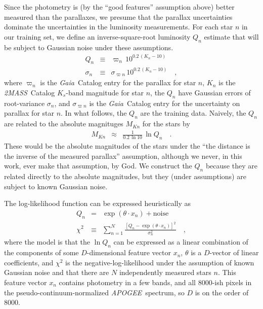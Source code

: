 \documentclass[modern]{aastex62}
\newcommand{\acronym}[1]{{\small{#1}}}
\newcommand{\project}[1]{\textsl{#1}}
\newcommand{\apogee}{\project{\acronym{APOGEE}}}
\newcommand{\gaia}{\project{Gaia}}
\newcommand{\zmass}{\project{\acronym{2MASS}}}
\begin{document}
Since the photometry is (by the ``good features'' assumption above)
better measured than the parallaxes, we
presume that the parallax uncertainties dominate
the uncertainties in the luminosity measurements.
For each star $n$ in our training set, we define an inverse-square-root
luminosity $Q_n$ estimate that will be subject to Gaussian noise under these assumptions.
\begin{eqnarray}
Q_n &\equiv& \varpi_n\,10^{0.2\,(K_n - 10)}
\\
\sigma_n &\equiv& \sigma_{\varpi n}\,10^{0.2\,(K_n - 10)}
\quad,
\end{eqnarray}
where
$\varpi_n$ is the \gaia\ Catalog entry for the parallax for star $n$,
$K_n$ is the \zmass\ Catalog $K_s$-band magnitude for star $n$,
the $Q_n$ have Gaussian errors of root-variance $\sigma_n$,
and $\sigma_{\varpi n}$ is the \gaia\ Catalog entry for the uncertainty on parallax
for star $n$.
In what follows, the $Q_n$ are the training data.
Naively, the $Q_n$ are related to the absolute magnituges $M_{Kn}$ for the stars by
\begin{eqnarray}
M_{Kn} &\approx& \frac{1}{0.2\,\ln 10}\,\ln Q_n
\quad.
\end{eqnarray}
These would be the absolute magnitudes of the stars under the
``the distance is the inverse of the
measured parallax'' assumption, although we never, in this work, ever make that
assumption, by God.
We construct the $Q_n$ because they are related directly to the absolute magnitudes,
but they (under assumptions) are subject to known Gaussian noise.

The log-likelihood function can be expressed heuristically as
\begin{eqnarray}
Q_n &=& \exp(\theta\cdot x_n) + \mbox{noise}
\\
\chi^2 &\equiv& \sum_{n=1}^N \frac{[Q_n - \exp(\theta\cdot x_n)]^2}{\sigma_n^2}
\quad ,
\end{eqnarray}
where
the model is that the $\ln Q_n$ can be expressed as a linear combination of the components
of some $D$-dimensional feature vector $x_n$,
$\theta$ is a $D$-vector of linear coefficients,
and $\chi^2$ is the negative-log-likelihood
under the assumption of known Gaussian noise and
that there are $N$ independently measured stars $n$.
This feature vector $x_n$ contains photometry in a few bands, and all 8000-ish pixels
in the pseudo-continuum-normalized \apogee\ spectrum, so $D$ is on the order of 8000.
\end{document}
